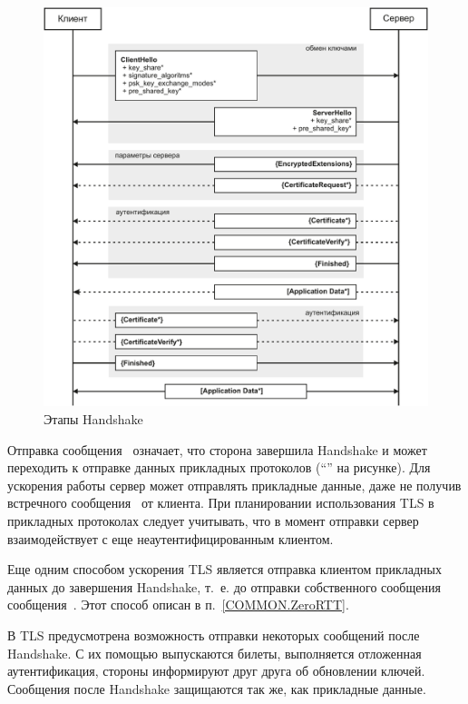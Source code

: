 \begin{figure}[hbt]
\begin{center}
\includegraphics[width=15cm]{../figs/Phases}
\end{center}
\caption{Этапы Handshake}\label{Fig.COMMON.Phases}
\end{figure}

Отправка сообщения~ означает, что сторона завершила
Handshake и может переходить к отправке данных прикладных протоколов
(``'' на рисунке). Для ускорения работы сервер может
отправлять прикладные данные, даже не получив встречного
сообщения~ от клиента. При планировании использования TLS в
прикладных протоколах следует учитывать, что в момент отправки сервер
взаимодействует с еще неаутентифицированным клиентом.

Еще одним способом ускорения TLS является отправка клиентом прикладных данных до
завершения Handshake, т.~е. до отправки собственного сообщения
сообщения~. Этот способ описан в
п.~\ref{COMMON.ZeroRTT}.

В TLS предусмотрена возможность отправки некоторых сообщений после Handshake. 
С их помощью выпускаются билеты, выполняется отложенная аутентификация, 
стороны информируют друг друга об обновлении ключей. Сообщения после Handshake 
защищаются так же, как прикладные данные.

